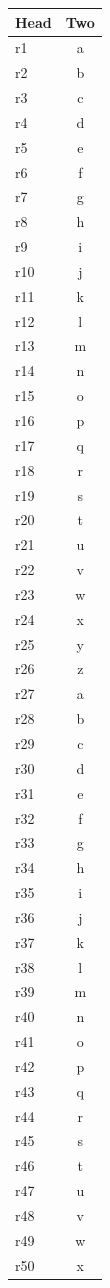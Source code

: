 \documentclass[12pt]{article}
\begin{document}
\begin{longtable}{lc}
\hline Head & Two\\\hline
\endhead
\hline
\endfoot
r1 & a\\
r2 & b\\
r3 & c\\
r4 & d\\
r5 & e\\
r6 & f\\
r7 & g\\
r8 & h\\
r9 & i\\
r10 & j\\
r11 & k\\
r12 & l\\
r13 & m\\
r14 & n\\
r15 & o\\
r16 & p\\
r17 & q\\
r18 & r\\
r19 & s\\
r20 & t\\
r21 & u\\
r22 & v\\
r23 & w\\
r24 & x\\
r25 & y\\
r26 & z\\
r27 & a\\
r28 & b\\
r29 & c\\
r30 & d\\
r31 & e\\
r32 & f\\
r33 & g\\
r34 & h\\
r35 & i\\
r36 & j\\
r37 & k\\
r38 & l\\
r39 & m\\
r40 & n\\
r41 & o\\
r42 & p\\
r43 & q\\
r44 & r\\
r45 & s\\
r46 & t\\
r47 & u\\
r48 & v\\
r49 & w\\
r50 & x\\

\end{longtable}
\end{document}
